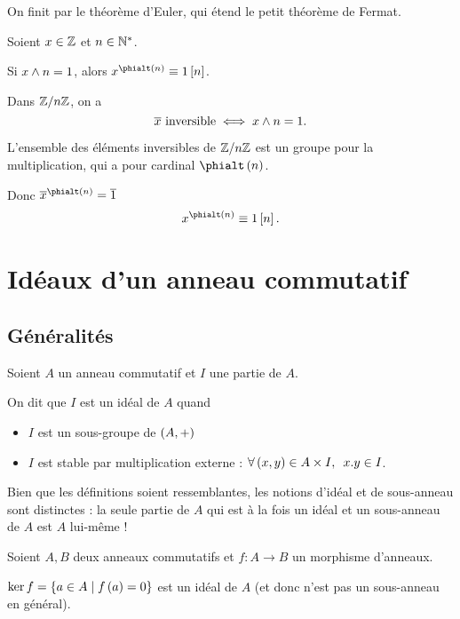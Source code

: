 On finit par le théorème d'Euler, qui étend le petit théorème de Fermat.

\begin{prop}
Soient \(x\in\mathbb{Z}\) et \(n\in\mathbb{N}^*\).

Si \(x\land n=1\), alors \(x^{\phialt\paren{n}}\equiv1\croch{n}\).
\end{prop}

\begin{dem}
Dans \(\mathbb{Z}/n\mathbb{Z}\), on a \[\overline{x}\text{ inversible}\iff x\land n=1.\]

L'ensemble des éléments inversibles de \(\mathbb{Z}/n\mathbb{Z}\) est un groupe pour la multiplication, qui a pour cardinal \(\phialt\paren{n}\).

Donc \(\conj{x}^{\phialt\paren{n}}=\conj{1}\) \ie \[x^{\phialt\paren{n}}\equiv1\croch{n}.\]
\end{dem}

\section{Idéaux d'un anneau commutatif}

\subsection{Généralités}

\begin{defi}
Soient \(A\) un anneau commutatif et \(I\) une partie de \(A\).

On dit que \(I\) est un idéal de \(A\) quand

\begin{itemize}
    \item \(I\) est un sous-groupe de \(\groupe{A}[+]\) \\
    \item \(I\) est stable par multiplication externe : \(\quantifs{\forall\paren{x,y}\in A\times I}x.y\in I\).
\end{itemize}
\end{defi}

\begin{rem}
Bien que les définitions soient ressemblantes, les notions d'idéal et de sous-anneau sont distinctes : la seule partie de \(A\) qui est à la fois un idéal et un sous-anneau de \(A\) est \(A\) lui-même !
\end{rem}

\begin{prop}
Soient \(A,B\) deux anneaux commutatifs et \(f:A\to B\) un morphisme d'anneaux.

\(\ker f=\left\lbrace a\in A\;\middle|\; f\left(a\right)=0\right\rbrace\) est un idéal de \(A\) (et donc n'est pas un sous-anneau en général).
\end{prop}

